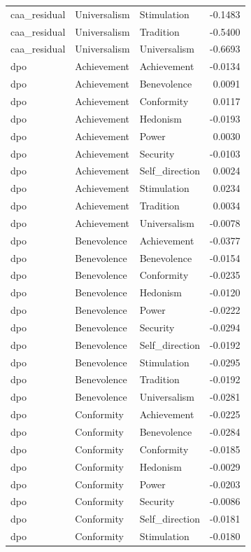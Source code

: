 \begin{tabular}{lllr}
caa\_residual & Universalism & Stimulation & -0.1483 \\
caa\_residual & Universalism & Tradition & -0.5400 \\
caa\_residual & Universalism & Universalism & -0.6693 \\
dpo & Achievement & Achievement & -0.0134 \\
dpo & Achievement & Benevolence & 0.0091 \\
dpo & Achievement & Conformity & 0.0117 \\
dpo & Achievement & Hedonism & -0.0193 \\
dpo & Achievement & Power & 0.0030 \\
dpo & Achievement & Security & -0.0103 \\
dpo & Achievement & Self\_direction & 0.0024 \\
dpo & Achievement & Stimulation & 0.0234 \\
dpo & Achievement & Tradition & 0.0034 \\
dpo & Achievement & Universalism & -0.0078 \\
dpo & Benevolence & Achievement & -0.0377 \\
dpo & Benevolence & Benevolence & -0.0154 \\
dpo & Benevolence & Conformity & -0.0235 \\
dpo & Benevolence & Hedonism & -0.0120 \\
dpo & Benevolence & Power & -0.0222 \\
dpo & Benevolence & Security & -0.0294 \\
dpo & Benevolence & Self\_direction & -0.0192 \\
dpo & Benevolence & Stimulation & -0.0295 \\
dpo & Benevolence & Tradition & -0.0192 \\
dpo & Benevolence & Universalism & -0.0281 \\
dpo & Conformity & Achievement & -0.0225 \\
dpo & Conformity & Benevolence & -0.0284 \\
dpo & Conformity & Conformity & -0.0185 \\
dpo & Conformity & Hedonism & -0.0029 \\
dpo & Conformity & Power & -0.0203 \\
dpo & Conformity & Security & -0.0086 \\
dpo & Conformity & Self\_direction & -0.0181 \\
dpo & Conformity & Stimulation & -0.0180 \\

\end{tabular}
